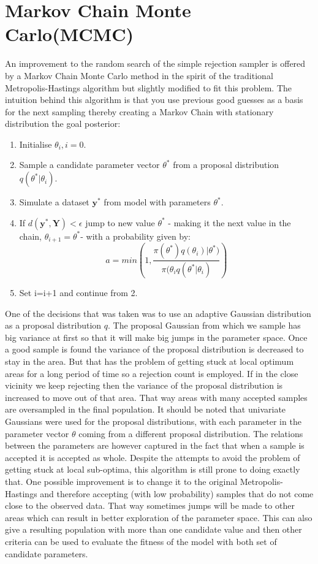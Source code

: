 \section{Markov Chain Monte Carlo(MCMC)}
An improvement to the random search of the simple rejection sampler is offered by a Markov Chain Monte Carlo method in the spirit of the traditional Metropolis-Hastings algorithm but slightly modified to fit this problem\cite[] {marjoram2003markov}. The intuition behind this algorithm is that you use previous good guesses as a basis for the next sampling thereby creating a Markov Chain with stationary distribution the goal posterior:
\begin{enumerate}[noitemsep]
\item{Initialise $\theta_{i}, i = 0$.}
\item{Sample a candidate parameter vector $\theta^*$ from a proposal distribution $q(\theta^* | \theta_{i})$.}
\item{Simulate a dataset $\mathbf{y}^*$ from model with parameters $\theta^*$.}
\item{If $d(\mathbf{y}^*, \mathbf{Y}) < \epsilon$ jump to new value $\theta^*$ - making it the next value in the chain, $\theta_{i+1} = \theta^*$- with a probability given by:
\begin{equation}
a = min \left(1, \frac{\pi(\theta^*)q(\theta_{i}) | \theta^*)}{\pi(\theta_{i}q(\theta^*|\theta_{i})}\right)
\end{equation}}
\item{Set i=i+1 and continue from 2.}
\end{enumerate}
One of the decisions that was taken was to use an adaptive Gaussian distribution as a proposal distribution $q$. The proposal Gaussian from which we sample has big variance at first so that it will make big jumps in the parameter space. Once a good sample is found the variance of the proposal distribution is decreased to stay in the area. But that has the problem of getting stuck at local optimum areas for a long period of time so a rejection count is employed. If in the close vicinity we keep rejecting then the variance of the proposal distribution is increased to move out of that area. That way areas with many accepted samples are oversampled in the final population. It should be noted that univariate Gaussians were used for the proposal distributions, with each parameter in the parameter vector $\theta$ coming from a different proposal distribution. The relations between the parameters are however captured in the fact that when a sample is accepted it is accepted as whole. Despite the attempts to avoid the problem of getting stuck at local sub-optima, this algorithm is still prone to doing exactly that. One possible improvement is to change it to the original Metropolis-Hastings and therefore accepting (with low probability) samples that do not come close to the observed data. That way sometimes jumps will be made to other areas which can result in better exploration of the parameter space. This can also give a resulting population with more than one candidate value and then other criteria can be used to evaluate the fitness of the model with both set of candidate parameters. 
